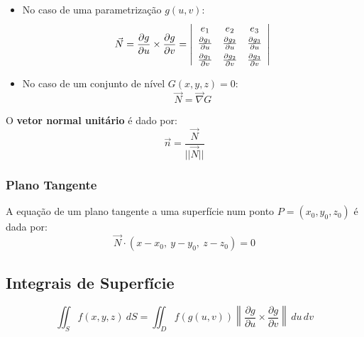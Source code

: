 \documentclass[11pt, a4paper]{article}
\begin{document}
\begin{itemize}
    \item No caso de uma parametrização $g(u,v)$:
          \begin{equation*}
              \vec{N} = \frac{\partial g}{\partial u} \times \frac{\partial g}{\partial v}
              = \left\vert
              \begin{array}{c c c}
                  e_1                             & e_2 & e_3 \\[2pt]
                  \frac{\partial g_1}{\partial u} &
                  \frac{\partial g_2}{\partial u} &
                  \frac{\partial g_3}{\partial u}             \\[4pt]
                  \frac{\partial g_1}{\partial v} &
                  \frac{\partial g_2}{\partial v} &
                  \frac{\partial g_3}{\partial v}
              \end{array}
              \right\vert
          \end{equation*}
    \item No caso de um conjunto de nível $G(x, y, z) = 0$:
          \begin{equation*}
              \vec{N} = \vec{\nabla} G
          \end{equation*}
\end{itemize}

O \textbf{vetor normal unitário} é dado por:
\begin{equation*}
    \vec{n} = \frac{\vec{N}}{||\vec{N}||}
\end{equation*}

\subsubsection{Plano Tangente}

A equação de um plano tangente a uma superfície num ponto $P = (x_0, y_0, z_0)$ é dada por:
\begin{equation*}
    \vec{N} \cdot \left(x - x_0,\ y - y_0,\ z - z_0\right) = 0
\end{equation*}

\subsection{Integrais de Superfície}

\begin{equation*}
    \iint_S f(x, y, z) \ dS = \iint_D f(g(u, v))
    \left\lVert
    \frac{\partial g}{\partial u} \times
    \frac{\partial g}{\partial v}
    \right\rVert \, du\,dv
\end{equation*}
\end{document}

